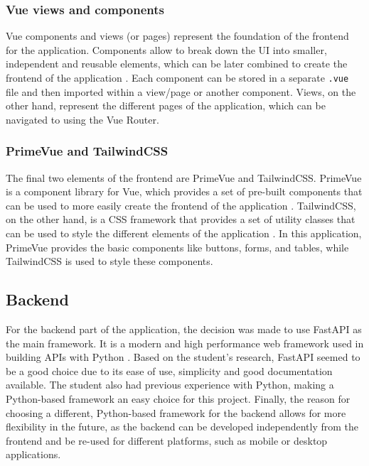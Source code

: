 \subsubsection{Vue views and components}

Vue components and views (or pages) represent the foundation of the frontend for the application. Components allow to break down the UI into smaller, independent and reusable elements, which can be later combined to create the frontend of the application \parencite{vuecomponents}. Each component can be stored in a separate \lstinline{.vue} file and then imported within a view/page or another component. Views, on the other hand, represent the different pages of the application, which can be navigated to using the Vue Router.

\subsubsection{PrimeVue and TailwindCSS}

The final two elements of the frontend are PrimeVue and TailwindCSS. PrimeVue is a component library for Vue, which provides a set of pre-built components that can be used to more easily create the frontend of the application \parencite{primevue}. TailwindCSS, on the other hand, is a CSS framework that provides a set of utility classes that can be used to style the different elements of the application \parencite{tailwind}. In this application, PrimeVue provides the basic components like buttons, forms, and tables, while TailwindCSS is used to style these components.

\subsection{Backend}

For the backend part of the application, the decision was made to use FastAPI as the main framework. It is a modern and high performance web framework used in building APIs with Python \parencite{fastapi}. Based on the student's research, FastAPI seemed to be a good choice due to its ease of use, simplicity and good documentation available. The student also had previous experience with Python, making a Python-based framework an easy choice for this project. Finally, the reason for choosing a different, Python-based framework for the backend allows for more flexibility in the future, as the backend can be developed independently from the frontend and be re-used for different platforms, such as mobile or desktop applications. 

